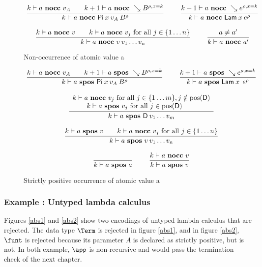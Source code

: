 \newcommand{\nocc}[3]{#1\vdash#2\mbox{ \textbf{nocc} }#3}



\begin{figure}[htp]
\begin{gather*}
\nru{}
{\nocc{k}{a}{v_A} \qquad \nocc{k+1}{a}{\wh \cl{B}{\ins{\rho}{x}{k}}}}
{\nocc{k}{a}{\vpi \: x \: v_A \: \cl{B}{\rho}}  }
\qquad
\nru{}
{\nocc{k+1}{a}{\wh \cl{e}{\ins{\rho}{x}{k}}}}
{\nocc{k}{a}{\vlam \: x \: \cl{e}{\rho}}  }
\\[2ex]
\nru{}
{\nocc{k}{a}{v} \qquad \nocc{k}{a}{v_j} \mbox{ for all } j \in \{1 \ldots n \}}
{\nocc{k}{a}{v \: v_1 \ldots v_n}}
\qquad
\nru{}
{a \neq a'}
{\nocc{k}{a}{a'}}
\end{gather*}
\caption{Non-occurrence of atomic value a}
\label{fnocc}
\end{figure}

\begin{figure}[htp]
\begin{gather*}
\nru{}
{ \nocc{k}{a}{v_A} \qquad \spos{k+1}{a}{\wh \cl{B}{\ins{\rho}{x}{k}}}}
{\spos{k}{a}{\vpi \: x \: v_A \: \cl{B}{\rho}}  }
\qquad
\nru{}
{\spos{k+1}{a}{\wh \cl{e}{\ins{\rho}{x}{k}}}}
{\spos{k}{a}{\vlam \: x \: \: \cl{e}{\rho}}  }
\\[2ex]
\ndru{}
{\nocc{k}{a}{v_j} \mbox{ for all } j \in \{ 1 \ldots m\} , j \notin \pos(\DD)}
{\spos{k}{a}{v_j} \mbox{ for all } j \in \pos(\DD) \qquad}
{\spos{k}{a}{\DD \: v_1 \ldots v_m}}
\\[2ex]
\nru{}
{\spos{k}{a}{v} \qquad \nocc{k}{a}{v_j} \mbox{ for all } j \in \{1 \ldots n \}}
{\spos{k}{a}{v \: v_1 \ldots v_n}}
\\[2ex]
\nru{}
{}
{\spos{k}{a}{a}}
\qquad
\nru{}
{\nocc{k}{a}{v}}
{\spos{k}{a}{v}}
\end{gather*}
\caption{Strictly positive occurrence of atomic value a}
\label{fspos}
\end{figure}


\subsubsection{Example : Untyped lambda calculus}
Figures \ref{abs1} and \ref{abs2} show two encodings of untyped lambda calculus that are rejected. 
The data type $\Term$ is rejected in figure \ref{abs1}, and in figure \ref{abs2}, $\funt$ is rejected because its parameter $A$ is declared as strictly positive, but is not.
In both example, $\app$ is non-recursive and would pass the termination check of the next chapter.


